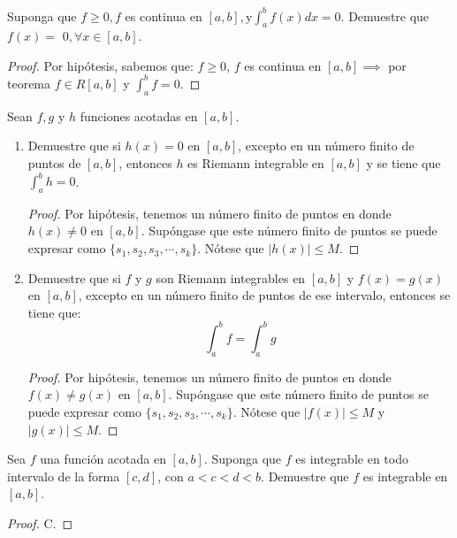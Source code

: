 





\begin{problema}
	Suponga que $f \geq 0, f$ es continua en $[a, b], \mathrm{y} \int_{a}^{b} f(x) d x=0 .$ Demuestre que $f(x)=$ $0, \forall x \in[a, b]$.
\end{problema}

\begin{proof}
	Por hipótesis, sabemos que: $f\geq 0$, $f$ es continua en $[a,b]\implies $ por teorema $f\in R[a,b]$ y $\int_a^b f=0$. 
\end{proof}





\begin{problema}
	Sean $f, g$ y $h$ funciones acotadas en $[a, b]$.
	\begin{enumerate}
		\item Demuestre que si $h(x)=0$ en $[a, b]$, excepto en un número finito de puntos de $[a, b]$, entonces $h$ es Riemann integrable en $[a, b]$ y se tiene que $\int_{a}^{b} h=0$.
		\begin{proof}
			Por hipótesis, tenemos un número finito de puntos en donde $h(x)\neq 0$ en $[a,b]$. Supóngase que este número finito de puntos se puede expresar como $\{s_1,s_2,s_3,\cdots, s_k\}$.  Nótese que $|h(x)|\leq M$. 
		\end{proof}
		\item Demuestre que si $f$ y $g$ son Riemann integrables en $[a, b]$ y $f(x)=g(x)$ en $[a, b]$, excepto en un número finito de puntos de ese intervalo, entonces se tiene que:
		$$
		\int_{a}^{b} f=\int_{a}^{b} g
		$$
		\begin{proof}
		Por hipótesis, tenemos un número finito de puntos en donde $f(x)\neq g(x)$ en $[a,b]$. Supóngase que este número finito de puntos se puede expresar como $\{s_1,s_2,s_3,\cdots, s_k\}$. Nótese que $|f(x)|\leq M$ y $|g(x)|\leq M$. 
		\end{proof}
	\end{enumerate}
\end{problema}









\begin{problema}
	Sea $f$ una función acotada en $[a, b]$. Suponga que $f$ es integrable en todo intervalo de la forma $[c, d]$, con $a<c<d<b$. Demuestre que $f$ es integrable en $[a, b]$.
\end{problema}
\begin{proof}
	C.
\end{proof}










